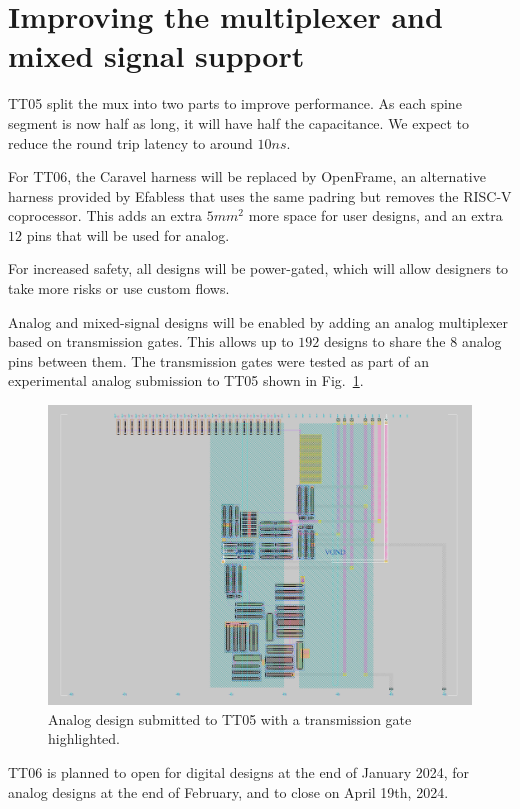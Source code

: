 \section{Improving the multiplexer and mixed signal support}
\label{sec:improving}

TT05 split the mux into two parts to improve performance.
As each spine segment is now half as long, it will have half the capacitance.
We expect to reduce the round trip latency to around \(10 ns\).

For TT06, the Caravel harness will be replaced by OpenFrame\cite{openframe}, an alternative harness provided by Efabless that uses the same padring but removes the RISC-V coprocessor.
This adds an extra \(5 mm^2\) more space for user designs, and an extra \(12\) pins that will be used for analog.

For increased safety, all designs will be power-gated, which will allow designers to take more risks or use custom flows.

Analog and mixed-signal designs will be enabled by adding an analog multiplexer based on transmission gates\cite{transmissiongates}. 
This allows up to \(192\) designs to share the \(8\) analog pins between them.
The transmission gates were tested as part of an experimental analog submission to TT05 shown in Fig.~\ref{fig:transmission_gate_TT05}.

\begin{figure}[htp]
\centering
\includegraphics[width=\columnwidth]{./Figs/tt05_transmission_gate.png}
\caption{Analog design submitted to TT05 with a transmission gate highlighted.}
\label{fig:transmission_gate_TT05}
\end{figure}

TT06 is planned to open for digital designs at the end of January 2024, for analog designs at the end of February, and to close on April 19th, 2024.
